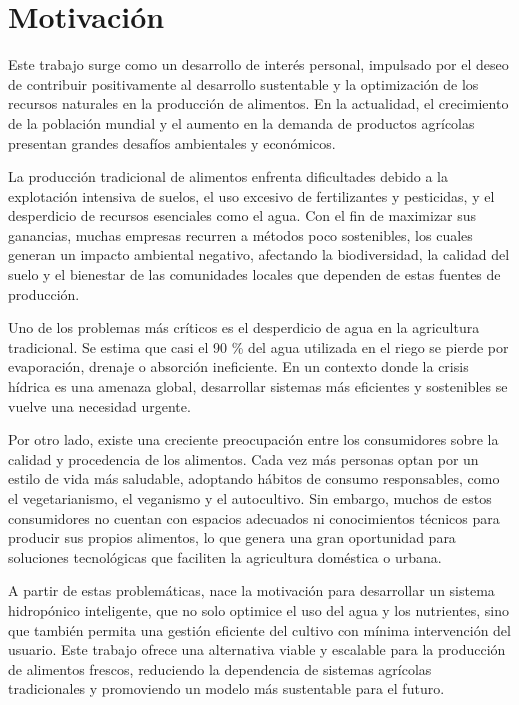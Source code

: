 
\section{Motivación}

Este trabajo surge como un desarrollo de interés personal, impulsado por el deseo de contribuir positivamente al desarrollo sustentable y la optimización de los recursos naturales en la producción de alimentos. En la actualidad, el crecimiento de la población mundial y el aumento en la demanda de productos agrícolas presentan grandes desafíos ambientales y económicos.

La producción tradicional de alimentos enfrenta dificultades debido a la explotación intensiva de suelos, el uso excesivo de fertilizantes y pesticidas, y el desperdicio de recursos esenciales como el agua. Con el fin de maximizar sus ganancias, muchas empresas recurren a métodos poco sostenibles, los cuales generan un impacto ambiental negativo, afectando la biodiversidad, la calidad del suelo y el bienestar de las comunidades locales que dependen de estas fuentes de producción.

Uno de los problemas más críticos es el desperdicio de agua en la agricultura tradicional. Se estima que casi el 90 \% del agua utilizada en el riego se pierde por evaporación, drenaje o absorción ineficiente. En un contexto donde la crisis hídrica es una amenaza global, desarrollar sistemas más eficientes y sostenibles se vuelve una necesidad urgente.

Por otro lado, existe una creciente preocupación entre los consumidores sobre la calidad y procedencia de los alimentos. Cada vez más personas optan por un estilo de vida más saludable, adoptando hábitos de consumo responsables, como el vegetarianismo, el veganismo y el autocultivo. Sin embargo, muchos de estos consumidores no cuentan con espacios adecuados ni conocimientos técnicos para producir sus propios alimentos, lo que genera una gran oportunidad para soluciones tecnológicas que faciliten la agricultura doméstica o urbana.

A partir de estas problemáticas, nace la motivación para desarrollar un sistema hidropónico inteligente, que no solo optimice el uso del agua y los nutrientes, sino que también permita una gestión eficiente del cultivo con mínima intervención del usuario. Este trabajo ofrece una alternativa viable y escalable para la producción de alimentos frescos, reduciendo la dependencia de sistemas agrícolas tradicionales y promoviendo un modelo más sustentable para el futuro.



